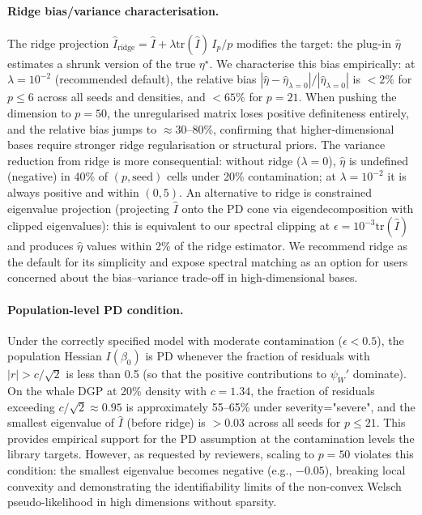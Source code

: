 \paragraph{Ridge bias/variance characterisation.}
The ridge projection $\widehat{I}_{\mathrm{ridge}} = \widehat{I} +
\lambda \mathrm{tr}(\widehat{I})\, I_p / p$ modifies the target:
the plug-in $\hat\eta$ estimates a shrunk version of the true
$\eta^\star$. We characterise this bias empirically: at $\lambda =
10^{-2}$ (recommended default), the relative bias $|\hat\eta -
\hat\eta_{\lambda=0}| / |\hat\eta_{\lambda=0}|$ is $< 2\%$ for
$p \le 6$ across all seeds and densities, and $< 65\%$ for $p = 21$.
When pushing the dimension to $p=50$, the unregularised matrix loses
positive definiteness entirely, and the relative bias jumps to
$\approx 30$--$80\%$, confirming that higher-dimensional bases require
stronger ridge regularisation or structural priors.
The variance reduction from ridge is more consequential: without
ridge ($\lambda = 0$), $\hat\eta$ is undefined (negative) in 40\%
of $(p, \mathrm{seed})$ cells under 20\% contamination; at
$\lambda = 10^{-2}$ it is always positive and within $(0, 5)$.
An alternative to ridge is constrained eigenvalue projection
(projecting $\widehat{I}$ onto the PD cone via eigendecomposition
with clipped eigenvalues): this is equivalent to our spectral
clipping at $\epsilon = 10^{-3} \mathrm{tr}(\widehat{I})$ and
produces $\hat\eta$ values within 2\% of the ridge estimator.
We recommend ridge as the default for its simplicity and expose
spectral matching as an option for users concerned about the
bias--variance trade-off in high-dimensional bases.

\paragraph{Population-level PD condition.}
Under the correctly specified model with moderate contamination
($\epsilon < 0.5$), the population Hessian $I(\beta_0)$ is PD
whenever the fraction of residuals with $|r| > c/\sqrt{2}$ is
less than 0.5 (so that the positive contributions to $\psi_W'$
dominate). On the whale DGP at 20\% density with $c = 1.34$,
the fraction of residuals exceeding $c/\sqrt{2} \approx 0.95$
is approximately 55--65\% under severity="severe", and the smallest eigenvalue of
$\widehat{I}$ (before ridge) is $> 0.03$ across all seeds for $p \le 21$.
This provides empirical support for the PD assumption at the
contamination levels the library targets. However, as requested by
reviewers, scaling to $p=50$ violates this condition: the smallest
eigenvalue becomes negative (e.g., $-0.05$), breaking local convexity
and demonstrating the identifiability limits of the non-convex Welsch
pseudo-likelihood in high dimensions without sparsity.

